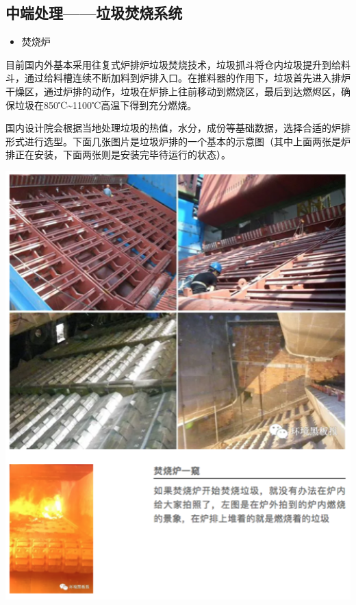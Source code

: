 \documentclass[]{book}
\providecommand{\tightlist}{%
  \setlength{\itemsep}{0pt}\setlength{\parskip}{0pt}}
\begin{document}
\hypertarget{ux4e2dux7aefux5904ux7406ux5783ux573eux711aux70e7ux7cfbux7edf}{%
\subsection{中端处理------垃圾焚烧系统}\label{ux4e2dux7aefux5904ux7406ux5783ux573eux711aux70e7ux7cfbux7edf}}

\begin{itemize}
\tightlist
\item
  焚烧炉
\end{itemize}

目前国内外基本采用往复式炉排炉垃圾焚烧技术，垃圾抓斗将仓内垃圾提升到给料斗，通过给料槽连续不断加料到炉排入口。在推料器的作用下，垃圾首先进入排炉干燥区，通过炉排的动作，垃圾在炉排上往前移动到燃烧区，最后到达燃烬区，确保垃圾在850℃\textasciitilde{}1100℃高温下得到充分燃烧。

国内设计院会根据当地处理垃圾的热值，水分，成份等基础数据，选择合适的炉排形式进行选型。下面几张图片是垃圾炉排的一个基本的示意图（其中上面两张是炉排正在安装，下面两张则是安装完毕待运行的状态）。

\includegraphics[width=6.72in]{images/ljfs4}
\end{document}
